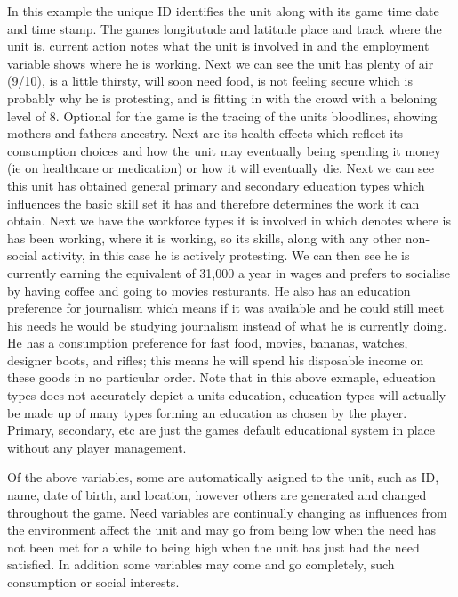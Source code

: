In this example the unique ID identifies the unit along with its game time date and time stamp. The games longitutude and latitude place and track where the unit is, current action notes what the unit is involved in and the employment variable shows where he is working.
Next we can see the unit has plenty of air (9/10), is a little thirsty, will soon need food, is not feeling secure which is probably why he is protesting, and is fitting in with the crowd with a beloning level of 8. Optional for the game is the tracing of the units bloodlines, showing mothers and fathers ancestry. Next are its health effects which reflect its consumption choices and how the unit may eventually being spending it money (ie on healthcare or medication) or how it will eventually die. Next we can see this unit has obtained general primary and secondary education types which influences the basic skill set it has and therefore determines the work it can obtain. Next we have the workforce types it is involved in which denotes where is has been working, where it is working, so its skills, along with any other non-social activity, in this case he is actively protesting. We can then see he is currently earning the equivalent of 31,000 a year in wages and prefers to socialise by having coffee and going to movies resturants. He also has an education preference for journalism which means if it was available and he could still meet his needs he would be studying journalism instead of what he is currently doing. He has 
a consumption preference for fast food, movies, bananas, watches, designer boots, and rifles; this means he will spend his disposable income on these goods in no particular order. Note that in this above exmaple, education types does not accurately depict a units education, education types will actually be made up of many types forming an education as chosen by the player. Primary, secondary, etc are just the games default educational system in place without any player management.
	

Of the above variables, some are automatically asigned to the unit, such as ID, name, date of birth, and location, however others are generated and changed throughout the game. Need variables are continually changing as influences from the environment affect the unit and may go from being low when the need has not been met for a while to being high when the unit has just had the need satisfied. In addition some variables may come and go completely, such consumption or social interests. 

